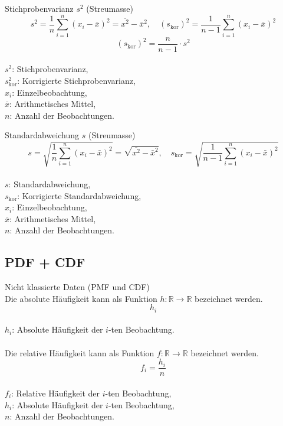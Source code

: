 \begin{definition}{Stichprobenvarianz $s^{2}$ (Streumasse)}\\
$$
s^{2}=\frac{1}{n} \sum_{i=1}^{n}\left(x_{i}-\bar{x}\right)^{2}=\overline{x^{2}}-\bar{x}^{2}, \quad\left(s_{\text{kor}}\right)^{2}=\frac{1}{n-1} \sum_{i=1}^{n}\left(x_{i}-\bar{x}\right)^{2}
$$
$$
\left(s_{\text{kor}}\right)^{2}=\frac{n}{n-1} \cdot s^{2}
$$
\\
$s^{2}$: Stichprobenvarianz, \\
$s_{\text{kor}}^{2}$: Korrigierte Stichprobenvarianz, \\
$x_{i}$: Einzelbeobachtung, \\
$\bar{x}$: Arithmetisches Mittel, \\
$n$: Anzahl der Beobachtungen.
\end{definition}

\begin{definition}{Standardabweichung $s$ (Streumasse)}\\
$$
s=\sqrt{\frac{1}{n} \sum_{i=1}^{n}\left(x_{i}-\bar{x}\right)^{2}}=\sqrt{\overline{x^{2}}-\bar{x}^{2}}, \quad s_{\text{kor}}=\sqrt{\frac{1}{n-1} \sum_{i=1}^{n}\left(x_{i}-\bar{x}\right)^{2}}
$$
\\
$s$: Standardabweichung, \\
$s_{\text{kor}}$: Korrigierte Standardabweichung, \\
$x_{i}$: Einzelbeobachtung, \\
$\bar{x}$: Arithmetisches Mittel, \\
$n$: Anzahl der Beobachtungen.
\end{definition}

\subsection{PDF + CDF}

\begin{definition}{Nicht klassierte Daten (PMF und CDF)}\\
Die absolute Häufigkeit kann als Funktion $h: \mathbb{R} \rightarrow \mathbb{R}$ bezeichnet werden.
$$
h_{i}
$$
\\
$h_{i}$: Absolute Häufigkeit der $i$-ten Beobachtung.
\\
\\
Die relative Häufigkeit kann als Funktion $f: \mathbb{R} \rightarrow \mathbb{R}$ bezeichnet werden.
$$
f_{i}=\frac{h_{i}}{n}
$$
\\
$f_{i}$: Relative Häufigkeit der $i$-ten Beobachtung, \\
$h_{i}$: Absolute Häufigkeit der $i$-ten Beobachtung, \\
$n$: Anzahl der Beobachtungen.
\end{definition}

